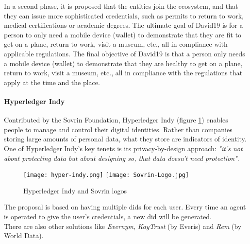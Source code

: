                     In a second phase\cite{que-es-david19}, it is proposed that the entities join the ecosystem, and that they can issue more sophisticated credentials, such as permits to return to work, medical certifications or academic degrees. The ultimate goal of David19 is for a person to only need a mobile device (wallet) to demonstrate that they are fit to get on a plane, return to work, visit a museum, etc., all in compliance with applicable regulations. The final objective of David19 is that a person only needs a mobile device (wallet) to demonstrate that they are healthy to get on a plane, return to work, visit a museum, etc., all in compliance with the regulations that apply at the time and the place.

                \paragraph{Hyperledger Indy}
                    Contributed by the Sovrin Foundation\cite{sovrin-yt,sovrin}, Hyperledger Indy\cite{indy-gh,indy} (figure \ref{fig:indy}) enables people to manage and control their digital identities. Rather than companies storing large amounts of personal data, what they store are indicators of identity. One of Hyperledger Indy's key tenets is its privacy-by-design approach: \textit{"it's not about protecting data but about designing so, that data doesn't need protection"}.\\
                    \begin{figure}[h]
                        \centering
                        \texttt{[image: hyper-indy.png]}
                        \texttt{[image: Sovrin-Logo.jpg]}\hfill
                        \caption{Hyperledger Indy and Sovrin logos}
                        \label{fig:indy}
                    \end{figure}
                    
                    The proposal is based on having multiple \acrshort{did}s for each user. Every time an agent is operated to give the user's credentials, a new \acrshort{did} will be generated.\\
                    
                There are also other solutions\cite{ssi-wallets} like \textit{Evernym}, \textit{KayTrust} (by Everis) and \textit{Rem} (by World Data).
\newpage

